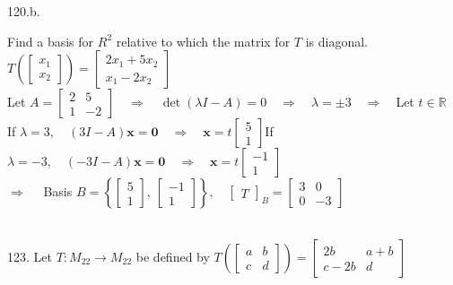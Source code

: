 \documentclass[12pt]{book}
\begin{document}
\begin{CJK}{UTF8}{bsmi}
120.b. \begin{minipage}[t]{\dimexpr\linewidth-2em}
Find a basis for $R^2$ relative to which the matrix for $T$ is diagonal.\quad$T\left(\begin{bmatrix}x_1\\x_2\end{bmatrix}\right)=\begin{bmatrix}2x_1+5x_2\\x_1-2x_2\end{bmatrix}$ \\
Let $A=\begin{bmatrix}
2 & 5 \\
1 & -2
\end{bmatrix}\quad\Rightarrow\quad\det(\lambda I-A)=0\quad\Rightarrow\quad\lambda=\pm3\quad\Rightarrow\quad$Let $t\in\mathbb{R}$ \\
If $\lambda=3,\quad(3I-A)\textbf{x}=\textbf{0}\quad\Rightarrow\quad\textbf{x}=t\begin{bmatrix}5\\1\end{bmatrix}$\qquad If $\lambda=-3,\quad(-3I-A)\textbf{x}=\textbf{0}\quad\Rightarrow\quad\textbf{x}=t\begin{bmatrix}-1\\1\end{bmatrix}$ \\
$\Rightarrow\quad$ Basis $B=\left\{\begin{bmatrix}5\\1\end{bmatrix},\ \begin{bmatrix}-1\\1\end{bmatrix}\right\},\quad\begin{bmatrix}T\end{bmatrix}_B=\begin{bmatrix}3&0\\0&-3\end{bmatrix}$
\end{minipage}\\

123. Let $T:M_{22}\rightarrow M_{22}$ be defined by $T\left(\begin{bmatrix}a&b\\c&d\end{bmatrix}\right)=\begin{bmatrix}2b&a+b\\c-2b&d\end{bmatrix}$


\end{CJK}
\end{document}
